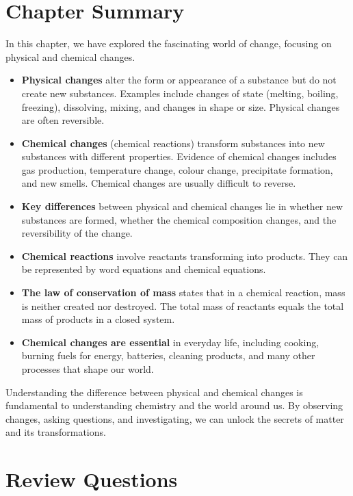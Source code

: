 \section*{Chapter Summary}

In this chapter, we have explored the fascinating world of change, focusing on physical and chemical changes.

\begin{itemize}
    \item \textbf{Physical changes} alter the form or appearance of a substance but do not create new substances. Examples include changes of state (melting, boiling, freezing), dissolving, mixing, and changes in shape or size. Physical changes are often reversible.
    \item \textbf{Chemical changes} (chemical reactions) transform substances into new substances with different properties. Evidence of chemical changes includes gas production, temperature change, colour change, precipitate formation, and new smells. Chemical changes are usually difficult to reverse.
    \item \textbf{Key differences} between physical and chemical changes lie in whether new substances are formed, whether the chemical composition changes, and the reversibility of the change.
    \item \textbf{Chemical reactions} involve reactants transforming into products. They can be represented by word equations and chemical equations.
    \item \textbf{The law of conservation of mass} states that in a chemical reaction, mass is neither created nor destroyed. The total mass of reactants equals the total mass of products in a closed system.
    \item \textbf{Chemical changes are essential} in everyday life, including cooking, burning fuels for energy, batteries, cleaning products, and many other processes that shape our world.
\end{itemize}

Understanding the difference between physical and chemical changes is fundamental to understanding chemistry and the world around us. By observing changes, asking questions, and investigating, we can unlock the secrets of matter and its transformations.

\section*{Review Questions}

